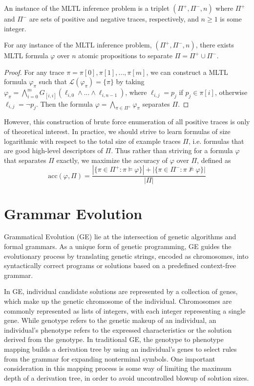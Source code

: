 \documentclass[runningheads]{llncs}
\renewcommand{\phi}{\varphi}
\begin{document}
\begin{definition}
    An instance of the MLTL inference problem is a triplet $(\Pi^+, \Pi^-, n)$ where $\Pi^+$ and $\Pi^-$ are sets of positive and negative traces, respectively, and $n \geq 1$ is some integer. 
\end{definition}
\begin{theorem}
    For any instance of the MLTL inference problem, $(\Pi^+, \Pi^-, n)$, there exists MLTL formula $\phi$ over $n$ atomic propositions to separate $\Pi = \Pi^+ \cup \Pi^-$. 
\end{theorem}
\begin{proof}
    For any trace $\pi = \pi[0],\pi[1],...,\pi[m]$, we can construct a MLTL formula $\phi_\pi$ such that $\mathcal{L}(\phi_\pi) = \{\pi\}$ by taking  $\phi_\pi = \bigwedge_{i = 0}^{m} G_{[i, i]}(\ell_{i,0} \land ... \land \ell_{i, n-1})$, where $\ell_{i, j} = p_j$ if $p_j \in \pi[i]$, otherwise $\ell_{i, j} = \neg p_j$. 
    Then the formula $\phi = \bigwedge_{\pi \in \Pi^+} \phi_\pi$ 
    separates $\Pi$.
\end{proof}

However, this construction of brute force enumeration of all positive traces is only of theoretical interest. In practice, we should strive to learn formulas of size logarithmic with respect to the total size of example traces $\Pi$, i.e. formulas that are good high-level descriptors of $\Pi$. Thus rather than striving for a formula $\phi$ that separates $\Pi$ exactly, we maximize the accuracy of $\phi$ over $\Pi$, defined as 
$$\text{acc}(\phi, \Pi) = 
\frac{|\{\pi \in \Pi^+ : \pi \vDash \phi\}| + |\{\pi \in \Pi^- : \pi \nvDash \phi\}|}{|\Pi|}$$
\section{Grammar Evolution}
Grammatical Evolution (GE) lie at the intersection of genetic algorithms and formal grammars. As a unique form of genetic programming, GE guides the evolutionary process by translating genetic strings, encoded as chromosomes, into syntactically correct programs or solutions based on a predefined context-free grammar. 

In GE, individual candidate solutions are represented by a collection of genes, which make up the genetic chromosome of the individual. 
Chromosomes are commonly represented as lists of integers, with each integer representing a single gene. 
While genotype refers to the genetic makeup of an individual, an individual's phenotype refers to the expressed characteristics or the solution derived from the genotype. 
In traditional GE, the genotype to phenotype mapping builds a derivation tree by using an individual's genes to select rules from the grammar for expanding nonterminal symbols. 
One important consideration in this mapping process is some way of limiting the maximum depth of a derivation tree, in order to avoid uncontrolled blowup of solution sizes. 
\end{document}
